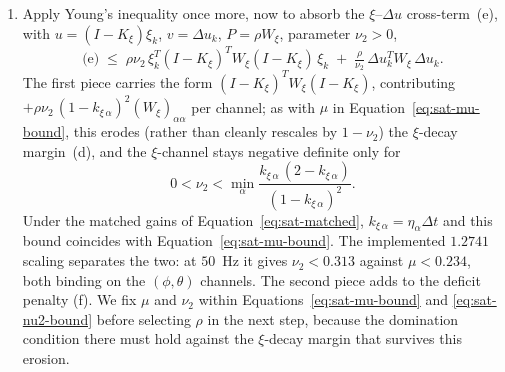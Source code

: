 \documentclass[conf]{new-aiaa}
\begin{document}
\begin{enumerate}
\item Apply Young’s inequality once more, now to absorb the $\xi$–$\Delta u$ cross-term~(e), with $u = (I-K_\xi)\xi_k$, $v = \Delta u_k$, $P = \rho W_\xi$, parameter $\nu_2 > 0$,
\small
\begin{equation}
\text{(e)} \;\leq\; \rho \nu_2\, \xi_k^T (I-K_\xi)^T W_\xi (I-K_\xi)\, \xi_k
\;+\; \tfrac{\rho}{\nu_2}\, \Delta u_k^T W_\xi\, \Delta u_k.
\end{equation}
\normalsize
The first piece carries the form $(I-K_\xi)^T W_\xi (I-K_\xi)$, contributing $+\rho\nu_2\,(1-k_{\xi\,\alpha})^2 (W_\xi)_{\alpha\alpha}$ per channel; as with $\mu$ in Equation~\ref{eq:sat-mu-bound}, this erodes (rather than cleanly rescales by $1-\nu_2$) the $\xi$-decay margin~(d), and the $\xi$-channel stays negative definite only for
\begin{equation}
\label{eq:sat-nu2-bound}
0 < \nu_2 < \min_\alpha \frac{k_{\xi\,\alpha}\,(2 - k_{\xi\,\alpha})}{(1-k_{\xi\,\alpha})^2}.
\end{equation}
Under the matched gains of Equation~\ref{eq:sat-matched}, $k_{\xi\,\alpha} = \eta_\alpha \Delta t$ and this bound coincides with Equation~\ref{eq:sat-mu-bound}. The implemented $1.2741$ scaling separates the two: at $50$~Hz it gives $\nu_2 < 0.313$ against $\mu < 0.234$, both binding on the $(\phi,\theta)$ channels. The second piece adds to the deficit penalty (f). We fix $\mu$ and $\nu_2$ within Equations~\ref{eq:sat-mu-bound} and \ref{eq:sat-nu2-bound} before selecting $\rho$ in the next step, because the domination condition there must hold against the $\xi$-decay margin that survives this erosion.


\end{enumerate}
\end{document}

